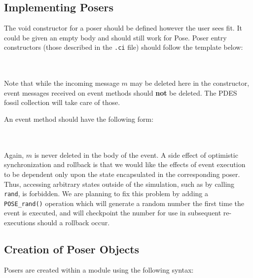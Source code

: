 \documentclass[10pt]{article}
\newcommand{\pose}{{\sc Pose}}
\begin{document}
\subsection{Implementing Posers}

The void constructor for a poser should be defined however the user
sees fit.  It could be given an empty body and should still work for
\pose{}.  Poser entry constructors (those described in the {\tt .ci}
file) should follow the template below:

~\\
\\

Note that while the incoming message $m$ may be deleted here in the
constructor, event messages received on event methods should {\bf not} be
deleted.  The PDES fossil collection will take care of those.

An event method should have the following form:

~\\
\\

Again, $m$ is never deleted in the body of the event.  A side effect
of optimistic synchronization and rollback is that we would like the
effects of event execution to be dependent only upon the state
encapsulated in the corresponding poser.  Thus, accessing arbitrary
states outside of the simulation, such as by calling {\tt rand}, is
forbidden.  We are planning to fix this problem by adding a {\tt
  POSE\_rand()} operation which will generate a random number the first
time the event is executed, and will checkpoint the number for use in
subsequent re-executions should a rollback occur.

\subsection{Creation of Poser Objects}

Posers are created within a module using the following syntax:
\end{document}
